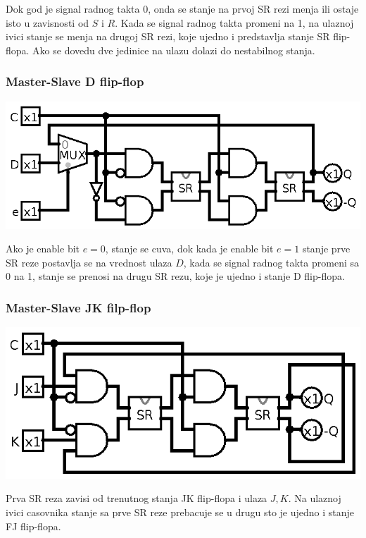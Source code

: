 \documentclass[12p,a4paper]{article}
\begin{document}
\begin{multicols}{2}
    Dok god je signal radnog takta 0, onda se stanje na prvoj SR rezi menja 
    ili ostaje isto u zavisnosti od $S$ i $R$. Kada se signal radnog takta
    promeni na 1, na ulaznoj ivici stanje se menja na drugoj SR rezi, koje
    ujedno i predstavlja stanje SR flip-flopa. Ako se dovedu dve jedinice na
    ulazu dolazi do nestabilnog stanja.

    \subsubsection{Master-Slave D flip-flop}

    \includegraphics[width=0.9\columnwidth]{Figures/d_ms_flipflop.png}

    Ako je enable bit $e = 0$, stanje se cuva, dok kada je enable bit 
    $e = 1$ stanje prve SR reze postavlja se na vrednost ulaza $D$, kada se
    signal radnog takta promeni sa 0 na 1, stanje se prenosi na drugu SR rezu,
    koje je ujedno i stanje D flip-flopa.

    \subsubsection{Master-Slave JK filp-flop}

    \includegraphics[width=0.9\columnwidth]{Figures/jk_ms_flipflop.png}

    Prva SR reza zavisi od trenutnog stanja JK flip-flopa i ulaza $J, K$. Na
    ulaznoj ivici casovnika stanje sa prve SR reze prebacuje se u drugu sto je
    ujedno i stanje FJ flip-flopa.


\end{multicols}
\end{document}
